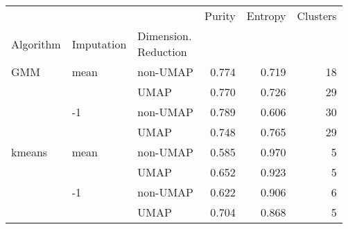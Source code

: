 \begin{tabular}{lllrrr}
\toprule
       &    &      &  Purity &  Entropy &  Clusters \\
Algorithm & Imputation & \thead{Dimension. \\Reduction} &         &          &           \\
\midrule
GMM & mean & non-UMAP &   0.774 &    0.719 &        18 \\
       &    & UMAP &   0.770 &    0.726 &        29 \\
       & -1 & non-UMAP &   0.789 &    0.606 &        30 \\
       &    & UMAP &   0.748 &    0.765 &        29 \\
kmeans & mean & non-UMAP &   0.585 &    0.970 &         5 \\
       &    & UMAP &   0.652 &    0.923 &         5 \\
       & -1 & non-UMAP &   0.622 &    0.906 &         6 \\
       &    & UMAP &   0.704 &    0.868 &         5 \\
\bottomrule
\end{tabular}
